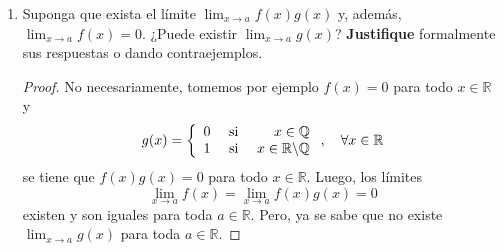 \documentclass[12pt]{article}
\begin{document}
\begin{enumerate}
\begin{proof}
        De (ii): Como existen los límites
        \begin{equation*}
            \lim_{x\rightarrow a}f(x)g(x)=l_1\quad\textup{y}\quad\lim_{x\rightarrow a}f(x)=l_2\neq 0
        \end{equation*}
        (donde $l_1,l_2\in\mathbb{R}$), en particular, existe el límite siguiente y su valor es:
        \begin{equation*}
            \lim_{x\rightarrow a}\frac{1}{f(x)}=\frac{1}{\lim_{x\rightarrow a}f(x)}=\frac{1}{l_2}
        \end{equation*}
        (por el teorema de álgebra de límites) luego, se tiene que:
        \begin{equation*}
            \lim_{x\rightarrow a }g(x)=\lim_{x\rightarrow a }\frac{1}{f(x)}g(x)f(x)=\left(\lim_{x\rightarrow a }\frac{1}{f(x)}\right)\cdot\left(\lim_{x\rightarrow a }g(x)f(x)\right)=\frac{1}{l_2}\cdot l_1=\frac{l_1}{l_2}
        \end{equation*}
        (nuevamente por el teorema de álgebra de límites y pues existe cada uno de los dos límites en el producto). Así, el límite anterior existe y su valor es el de la derecha.
    \end{proof}

    \item Suponga que exista el límite $\lim_{x\rightarrow a}f(x)g(x)$ y, además, $\lim_{x\rightarrow a}f(x)=0$. ¿Puede existir $\lim_{x\rightarrow a}g(x)$? \textbf{Justifique} formalmente sus respuestas o dando contraejemplos.
    
    \begin{proof}
        No necesariamente, tomemos por ejemplo $f(x)=0$ para todo $x\in\mathbb{R}$ y
        \begin{equation*}
            g(x)=\left\{
                \begin{array}{lcr}
                    0 & \textup{ si } & x\in\mathbb{Q}\\
                    1 & \textup{ si } & x\in\mathbb{R}\backslash\mathbb{Q}\\
                \end{array}
            \right.,\quad\forall x\in\mathbb{R}
        \end{equation*}
        se tiene que $f(x)g(x)=0$ para todo $x\in\mathbb{R}$. Luego, los límites
        \begin{equation*}
            \lim_{ x\rightarrow a}f(x)=\lim_{ x\rightarrow a}f(x)g(x)=0
        \end{equation*}
        existen y son iguales para toda $a\in\mathbb{R}$. Pero, ya se sabe que no existe $\lim_{ x\rightarrow a}g(x)$ para toda $a\in\mathbb{R}$.
    \end{proof}


\end{enumerate}
\end{document}
